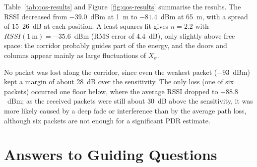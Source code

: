 \documentclass[informe,english]{plantilla}
\begin{document}
Table~\ref{tab:qos-results} and Figure~\ref{fig:qos-results} summarise the results. The RSSI decreased from $-39.0$~dBm at 1~m to $-81.4$~dBm at 65~m, with a spread of 15--26~dB at each position. A least-squares fit gives $n = 2.2$ with $RSSI(1~\text{m}) = -35.6$~dBm (RMS error of 4.4~dB), only slightly above free space: the corridor probably guides part of the energy, and the doors and columns appear mainly as large fluctuations of $X_\sigma$.

No packet was lost along the corridor, since even the weakest packet ($-93$~dBm) kept a margin of about 28~dB over the sensitivity. The only loss (one of six packets) occurred one floor below, where the average RSSI dropped to $-88.8$~dBm; as the received packets were still about 30~dB above the sensitivity, it was more likely caused by a deep fade or interference than by the average path loss, although six packets are not enough for a significant PDR estimate.

\section{Answers to Guiding Questions}
\label{sec:questions}
\end{document}
